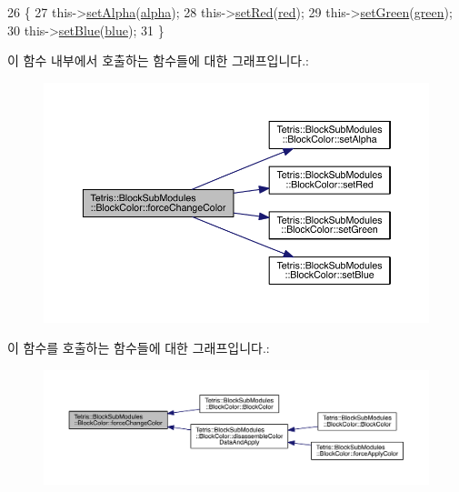 \begin{DoxyCode}
26                                                                                                            
                                   \{
27                 this->\hyperlink{class_tetris_1_1_block_sub_modules_1_1_block_color_a5fdd2d1a53d92ec0bcc1c25748b890e0}{setAlpha}(\hyperlink{class_tetris_1_1_block_sub_modules_1_1_block_color_af0983ea684f33617a0b482cfea1d3c2b}{alpha});
28                 this->\hyperlink{class_tetris_1_1_block_sub_modules_1_1_block_color_a9541e6b5b809214ae2691a99af06ac3f}{setRed}(\hyperlink{class_tetris_1_1_block_sub_modules_1_1_block_color_af8a0dc372e7dbab300290eadada8ef49}{red});
29                 this->\hyperlink{class_tetris_1_1_block_sub_modules_1_1_block_color_aeea8ab6d5f36d35fd4f28818349661ab}{setGreen}(\hyperlink{class_tetris_1_1_block_sub_modules_1_1_block_color_a4b28885bfd8bf53793c6b3daedd974eb}{green});
30                 this->\hyperlink{class_tetris_1_1_block_sub_modules_1_1_block_color_ac624156bd1f77a20d6e1d4c8cbff36d3}{setBlue}(\hyperlink{class_tetris_1_1_block_sub_modules_1_1_block_color_af04e78b9a1c2f7625863c289c4a741e3}{blue});
31             \}
\end{DoxyCode}
이 함수 내부에서 호출하는 함수들에 대한 그래프입니다.\+:
\nopagebreak
\begin{figure}[H]
\begin{center}
\leavevmode
\includegraphics[width=350pt]{de/d44/class_tetris_1_1_block_sub_modules_1_1_block_color_ae6d640629b11d880ca994923657adbe1_cgraph}
\end{center}
\end{figure}
이 함수를 호출하는 함수들에 대한 그래프입니다.\+:
\nopagebreak
\begin{figure}[H]
\begin{center}
\leavevmode
\includegraphics[width=350pt]{de/d44/class_tetris_1_1_block_sub_modules_1_1_block_color_ae6d640629b11d880ca994923657adbe1_icgraph}
\end{center}
\end{figure}
